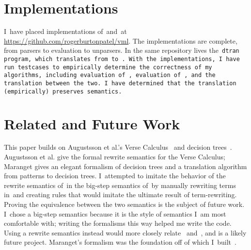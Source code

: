 \documentclass[manuscript,screen 12pt, nonacm]{acmart}
\begin{document}
        
    

    \section{Implementations}

    I~have placed implementations of~\VMinus and~\D at
    \url{https://github.com/rogerburtonpatel/vml}. The implementations are
    complete, from parsers to evaluation to unparsers. In the same repository
    lives the~\tt{dtran} program, which translates from~\VMinus to~\D. With the
    implementations, I~have run testcases to empirically determine the
    correctness of my algorithms, including evaluation of~\VMinus, evaluation
    of~\D, and the translation between the two. I~have determined that the
    translation (empirically) preserves semantics. 


    \section{Related and Future Work}

    This paper builds on Augustsson et al.'s Verse Calculus~\citep{verse} and
    decision trees~\citep{maranget}. Augustsson et al. give the formal rewrite
    semantics for the Verse Calculus; Maranget gives an elegant formalism of
    decision trees and a translation algorithm from patterns to decision trees.
    I~attempted to imitate the behavior of the rewrite semantics of~\VC in the
    big-step semantics of~\VMinus by manually rewriting terms in~\VC and
    creating rules that would imitate the ultimate result of term-rewriting.
    Proving the equivalence between the two semantics is the subject of future
    work. I~chose a big-step semantics because it is the style of semantics I~am
    most comfortable with; writing the formalisms this way helped me write the
    code. Using a rewrite semantics instead would more closely relate~\VMinus
    and~\VC, and is a likely future project. Maranget's formalism was the
    foundation off of which I~built~\D. 
    
\end{document}
